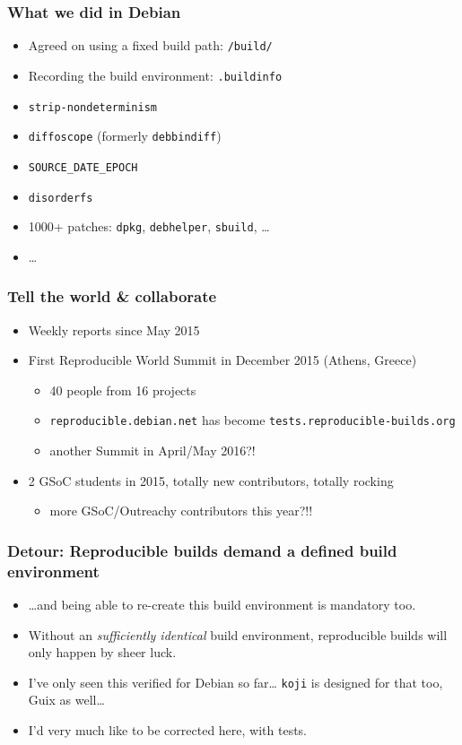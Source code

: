 \documentclass[14pt]{beamer}
\begin{document}
\begin{frame}
 \frametitle{What we did in Debian}

 \begin{itemize}
  \item Agreed on using a fixed build path: \texttt{/build/}
  \item Recording the build environment: \texttt{.buildinfo}
  \item \texttt{strip-nondeterminism}
  \item \texttt{diffoscope} (formerly \texttt{debbindiff})
  \item \texttt{SOURCE\_DATE\_EPOCH}
  \item \texttt{disorderfs}
  \item 1000+ patches: \texttt{dpkg}, \texttt{debhelper}, \texttt{sbuild}, …
  \item …
 \end{itemize}
\end{frame}


\begin{frame}
 \frametitle{Tell the world \& collaborate}

 \begin{itemize}
  \item Weekly reports since May 2015
  \item<2-4> First Reproducible World Summit in December 2015 (Athens, Greece)
   \begin{itemize}
    \item<2-4> 40 people from 16 projects
    \item<2-4> \texttt{reproducible.debian.net} has become
  \texttt{tests.reproducible-builds.org}
  \item<3-4> another Summit in April/May 2016?!
   \end{itemize}
  \item<4> 2 GSoC students in 2015, totally new contributors, totally rocking
  \begin{itemize}
 \item<4> more GSoC/Outreachy contributors this year?!!
   \end{itemize}
 \end{itemize}
\end{frame}

\begin{frame}
 \frametitle{Detour: Reproducible builds demand a defined build environment}
 \begin{itemize}
  \item …and being able to re-create this build environment is mandatory too.
  \item Without an \textit{sufficiently identical} build environment, reproducible builds will only
  happen by sheer luck.
  \item<2>{I've only seen this verified for Debian so far… \texttt{koji}
  is designed for that too, Guix as well…}
\item<2> {I'd very much like to be corrected here, with tests.}
 \end{itemize}
\end{frame}
\end{document}
